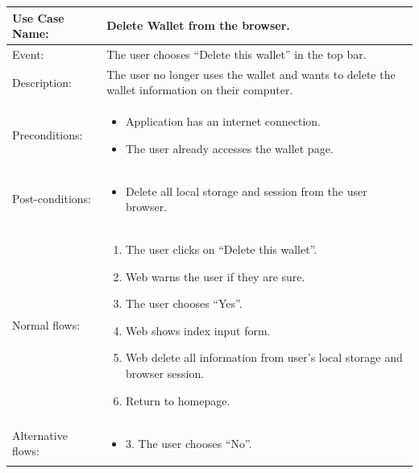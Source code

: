 \clearpage

\begin{table}[]
    \begin{tabular}{m{4cm} m{11cm}}
        \toprule
        Use Case Name:     & Delete Wallet from the browser.                                                                  \\ 
        \midrule 
        Event:             & The user chooses “Delete this wallet” in the top bar.                                            \\ 
        \midrule 
        Description:       & The user no longer uses the wallet and wants to delete the wallet information on their computer. \\ 
        \midrule 
        Preconditions:     & \begin{itemize}
            \item Application has an internet connection.
            \item The user already accesses the wallet page.
        \end{itemize}                                                                       \\ 
        \midrule 
        Post-conditions:   & \begin{itemize}
            \item Delete all local storage and session from the user browser.
        \end{itemize}                                                                       \\ 
        \midrule 
        Normal flows:      & \begin{enumerate}
            \item The user clicks on “Delete this wallet”.
            \item Web warns the user if they are sure.
            \item The user chooses “Yes”.
            \item Web shows index input form.
            \item Web delete all information from user's local storage and browser session.
            \item Return to homepage.
        \end{enumerate}                                                                       \\
        \midrule 
        Alternative flows: & \begin{itemize}
            \item {3. The user chooses “No”.}

\end{itemize}
\end{tabular}
\end{table}

